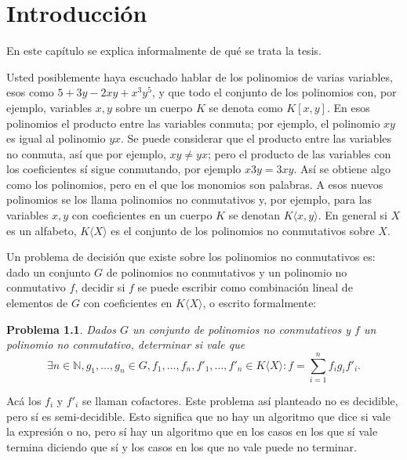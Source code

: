 \documentclass[12pt]{report}
\theoremstyle{customstyle}
\newtheorem{problem}{Problema}
\theoremstyle{factstyle}
\newcommand\cpp{C\nolinebreak[4]\hspace{-.05em}\raisebox{.4ex}{\relsize{-3}{\textbf{++}}}\xspace}
\begin{document}
\def\tituloTesis{Implementación de bases de Gröbner no conmutativas en \cpp con un poquito de paralelismo} %



\tableofcontents

\chapter{Introducción}

En este capítulo se explica informalmente de qué se trata la tesis.

Usted posiblemente haya escuchado hablar de los polinomios de varias variables, esos como $5 + 3 y - 2 x y + x^3 y^5$, y que todo el conjunto de los polinomios con, por ejemplo, variables $x, y$ sobre un cuerpo $K$ se denota como $K[x, y]$. En esos polinomios el producto entre las variables conmuta; por ejemplo, el polinomio $x y$ es igual al polinomio $y x$. Se puede considerar que el producto entre las variables no conmuta, así que por ejemplo, $x y ≠ y x$; pero el producto de las variables con los coeficientes sí sigue conmutando, por ejemplo $x 3 y = 3 x y$. Así se obtiene algo como los polinomios, pero en el que los monomios son palabras. A esos nuevos polinomios se los llama polinomios no conmutativos y, por ejemplo, para las variables $x, y$ con coeficientes en un cuerpo $K$ se denotan $K⟨x, y⟩$. En general si $X$ es un alfabeto, $K⟨X⟩$ es el conjunto de los polinomios no conmutativos sobre $X$.

Un problema de decisión que existe sobre los polinomios no conmutativos es: dado un conjunto $G$ de polinomios no conmutativos y un polinomio no conmutativo $f$, decidir si $f$ se puede escribir como combinación lineal de elementos de $G$ con coeficientes en $K⟨X⟩$, o escrito formalmente:

\begin{problem}\label{problem:principal}
  Dados $G$ un conjunto de polinomios no conmutativos y $f$ un polinomio no conmutativo, determinar si vale que
  \[ ∃n ∈ ℕ, g_1, …, g_n ∈ G, f_1, …, f_n, f'_1, …, f'_n ∈ K⟨X⟩ : f = ∑_{i = 1}^n f_i g_i f'_i \text{.}\]
\end{problem}

Acá los $f_i$ y $f'_i$ se llaman cofactores. Este problema así planteado no es decidible, pero sí es semi-decidible. Esto significa que no hay un algoritmo que dice si vale la expresión o no, pero sí hay un algoritmo que en los casos en los que sí vale termina diciendo que sí y los casos en los que no vale puede no terminar.
\end{document}
